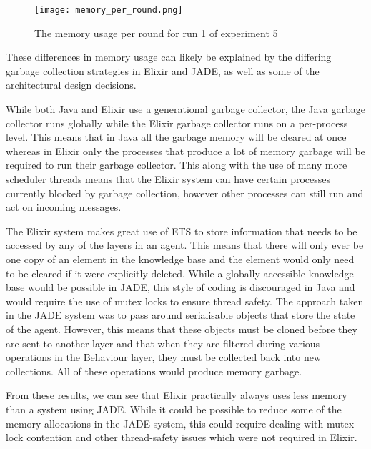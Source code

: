 \begin{figure}[ht]
    \centering
    \texttt{[image: memory\_per\_round.png]}
    \caption{The memory usage per round for run 1 of experiment 5}\label{fig:memory_per_round}
\end{figure}

These differences in memory usage can likely be explained by the differing garbage collection strategies in Elixir and JADE, as well as some of the architectural design decisions.

While both Java and Elixir use a generational garbage collector, the Java garbage collector runs globally while the Elixir garbage collector runs on a per-process level.
This means that in Java all the garbage memory will be cleared at once whereas in Elixir only the processes that produce a lot of memory garbage will be required to run their garbage collector.
This along with the use of many more scheduler threads means that the Elixir system can have certain processes currently blocked by garbage collection, however other processes can still run and act on incoming messages.

The Elixir system makes great use of ETS to store information that needs to be accessed by any of the layers in an agent.
This means that there will only ever be one copy of an element in the knowledge base and the element would only need to be cleared if it were explicitly deleted.
While a globally accessible knowledge base would be possible in JADE, this style of coding is discouraged in Java and would require the use of mutex locks to ensure thread safety.
The approach taken in the JADE system was to pass around serialisable objects that store the state of the agent.
However, this means that these objects must be cloned before they are sent to another layer and that when they are filtered during various operations in the Behaviour layer, they must be collected back into new collections.
All of these operations would produce memory garbage.

From these results, we can see that Elixir practically always uses less memory than a system using JADE\@.
While it could be possible to reduce some of the memory allocations in the JADE system, this could require dealing with mutex lock contention and other thread-safety issues which were not required in Elixir.
